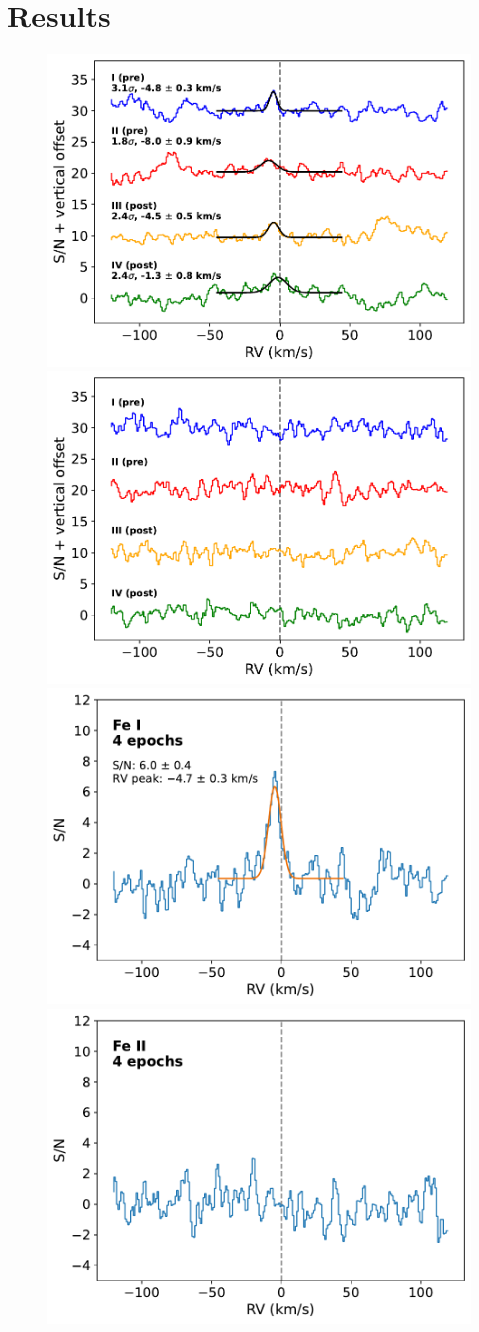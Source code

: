 \documentclass{aa}
\begin{document}
\section{Results} \label{results}


\begin{figure}[h!]
    \centering
    \includegraphics[width=0.49\hsize]{plots_submission2/W76b_Fe_ccf_snr_scaled_gauss_ABCD_summed_planetframe_ecc_zero_TP1_NEWg.pdf}
    \includegraphics[width=0.49\hsize]{plots_submission2/W76b_FePlus_ccf_snr_scaled_gauss_ABCD_summed_planetframe_ecc_zero_TP1_NEWg.pdf}
    \includegraphics[width=0.49\hsize]{plots_submission2/W76b_Fe_FpFs_ccf_snr_scaled_gauss_4timeseries_summed_planetframe_ecc_zero_TP01_NEWg.pdf}
    \includegraphics[width=0.49\hsize]{plots_submission2/W76b_FePlus_FpFs_ccf_snr_scaled_gauss_4timeseries_summed_planetframe_ecc_zero_TP01_NEWg.pdf}

\end{figure}
\end{document}

